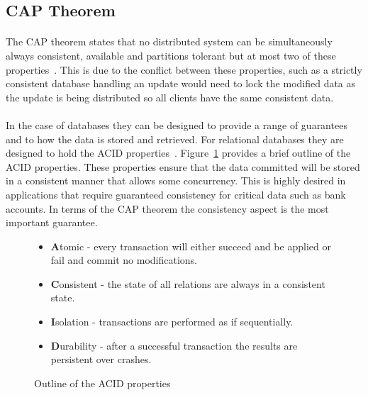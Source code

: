 \documentclass{CRPITStyle}
\renewcommand{\cite}{\citep}
\begin{document}
\subsection{CAP Theorem}

\paragraph{}
The CAP theorem states that no distributed system can be
simultaneously always consistent, available and
partitions tolerant but at most two of these properties~\cite{base,nosql_db,compare_nosql,nosql_survey}.
This is due to the conflict between these properties, such as a
strictly consistent database handling an update would
need to lock the modified data as the update is being distributed
so all clients have the same consistent data.


\paragraph{}
In the case of databases they can be designed to provide a
range of guarantees and to how the data is stored and retrieved.
For relational databases they are designed to hold
the ACID properties~\cite{relational_db,base}.
Figure~\ref{l:acid} provides a brief outline of the ACID properties.
These properties ensure that the data committed will be stored in a 
consistent manner that allows some concurrency.
This is highly desired in applications that require guaranteed consistency
for critical data such as bank accounts.
In terms of the CAP theorem the consistency aspect is the most important
guarantee.

\begin{figure}
\begin{itemize}
    \item \textbf{A}tomic - every transaction will either
        succeed and be applied or fail and commit no modifications.
    \item \textbf{C}onsistent - the state of all relations are
        always in a consistent state.
    \item \textbf{I}solation - transactions are performed as if sequentially.
    \item \textbf{D}urability - after a successful transaction the results
        are persistent over crashes.
\end{itemize}
    \caption{Outline of the ACID properties~\cite{relational_db,base}}\label{l:acid}
\end{figure}
%
\end{document}
